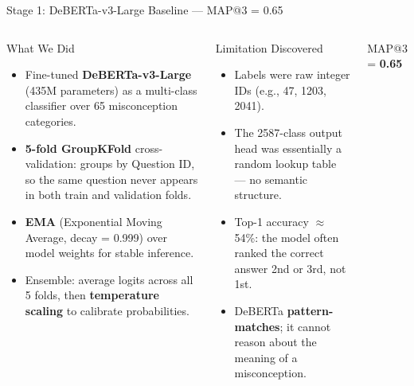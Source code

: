 \documentclass[aspectratio=169]{beamer}
\begin{document}
\begin{frame}{Stage 1: DeBERTa-v3-Large Baseline \texorpdfstring{--- MAP@3 = 0.65}{}}
\begin{columns}[T]
\begin{block}{What We Did}
\begin{itemize}
  \item Fine-tuned \textbf{DeBERTa-v3-Large} (435M parameters) as a multi-class classifier over 65 misconception categories.
  \item \textbf{5-fold GroupKFold} cross-validation: groups by Question ID, so the same question never appears in both train and validation folds.
  \item \textbf{EMA} (Exponential Moving Average, decay = 0.999) over model weights for stable inference.
  \item Ensemble: average logits across all 5 folds, then \textbf{temperature scaling} to calibrate probabilities.
\end{itemize}
\end{block}
\begin{alertblock}{Limitation Discovered}
\begin{itemize}
  \item Labels were raw integer IDs (e.g., 47, 1203, 2041).
  \item The 2587-class output head was essentially a random lookup table --- no semantic structure.
  \item Top-1 accuracy $\approx$ 54\%: the model often ranked the correct answer 2nd or 3rd, not 1st.
  \item DeBERTa \textbf{pattern-matches}; it cannot reason about the meaning of a misconception.
\end{itemize}
\end{alertblock}
\vspace{6pt}
\begin{center}
{\Large\color{TitleBlue} MAP@3 = \textbf{0.65}}
\end{center}
\end{columns}
\end{frame}
\end{document}
